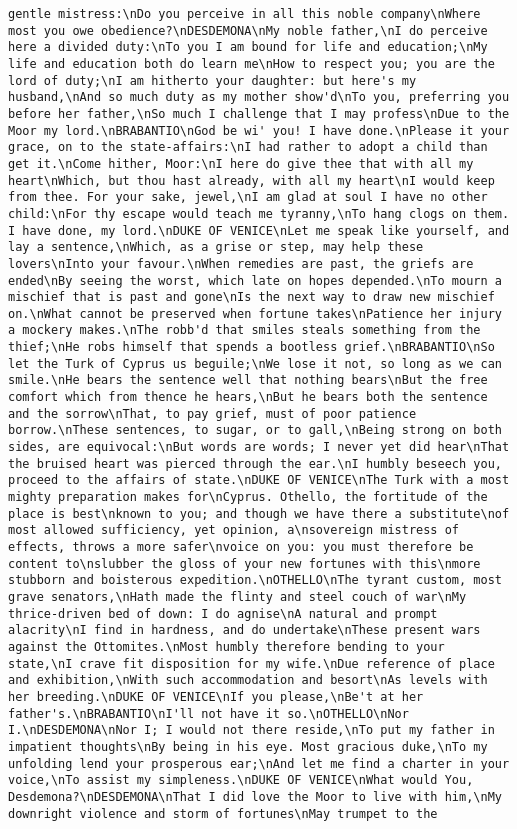 \begin{verbatim}
gentle mistress:\nDo you perceive in all this noble company\nWhere most you owe obedience?\nDESDEMONA\nMy noble father,\nI do perceive here a divided duty:\nTo you I am bound for life and education;\nMy life and education both do learn me\nHow to respect you; you are the lord of duty;\nI am hitherto your daughter: but here's my husband,\nAnd so much duty as my mother show'd\nTo you, preferring you before her father,\nSo much I challenge that I may profess\nDue to the Moor my lord.\nBRABANTIO\nGod be wi' you! I have done.\nPlease it your grace, on to the state-affairs:\nI had rather to adopt a child than get it.\nCome hither, Moor:\nI here do give thee that with all my heart\nWhich, but thou hast already, with all my heart\nI would keep from thee. For your sake, jewel,\nI am glad at soul I have no other child:\nFor thy escape would teach me tyranny,\nTo hang clogs on them. I have done, my lord.\nDUKE OF VENICE\nLet me speak like yourself, and lay a sentence,\nWhich, as a grise or step, may help these lovers\nInto your favour.\nWhen remedies are past, the griefs are ended\nBy seeing the worst, which late on hopes depended.\nTo mourn a mischief that is past and gone\nIs the next way to draw new mischief on.\nWhat cannot be preserved when fortune takes\nPatience her injury a mockery makes.\nThe robb'd that smiles steals something from the thief;\nHe robs himself that spends a bootless grief.\nBRABANTIO\nSo let the Turk of Cyprus us beguile;\nWe lose it not, so long as we can smile.\nHe bears the sentence well that nothing bears\nBut the free comfort which from thence he hears,\nBut he bears both the sentence and the sorrow\nThat, to pay grief, must of poor patience borrow.\nThese sentences, to sugar, or to gall,\nBeing strong on both sides, are equivocal:\nBut words are words; I never yet did hear\nThat the bruised heart was pierced through the ear.\nI humbly beseech you, proceed to the affairs of state.\nDUKE OF VENICE\nThe Turk with a most mighty preparation makes for\nCyprus. Othello, the fortitude of the place is best\nknown to you; and though we have there a substitute\nof most allowed sufficiency, yet opinion, a\nsovereign mistress of effects, throws a more safer\nvoice on you: you must therefore be content to\nslubber the gloss of your new fortunes with this\nmore stubborn and boisterous expedition.\nOTHELLO\nThe tyrant custom, most grave senators,\nHath made the flinty and steel couch of war\nMy thrice-driven bed of down: I do agnise\nA natural and prompt alacrity\nI find in hardness, and do undertake\nThese present wars against the Ottomites.\nMost humbly therefore bending to your state,\nI crave fit disposition for my wife.\nDue reference of place and exhibition,\nWith such accommodation and besort\nAs levels with her breeding.\nDUKE OF VENICE\nIf you please,\nBe't at her father's.\nBRABANTIO\nI'll not have it so.\nOTHELLO\nNor I.\nDESDEMONA\nNor I; I would not there reside,\nTo put my father in impatient thoughts\nBy being in his eye. Most gracious duke,\nTo my unfolding lend your prosperous ear;\nAnd let me find a charter in your voice,\nTo assist my simpleness.\nDUKE OF VENICE\nWhat would You, Desdemona?\nDESDEMONA\nThat I did love the Moor to live with him,\nMy downright violence and storm of fortunes\nMay trumpet to the 
\end{verbatim}
